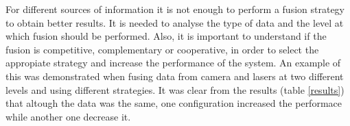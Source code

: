 For different sources of information it is not enough to perform a fusion strategy to obtain better results. It is needed to analyse the type of data and the level at which fusion should be performed. Also, it is important to understand if the fusion is competitive, complementary or cooperative, in order to select the appropiate strategy and increase the performance of the system. An example of this was demonstrated when fusing data from camera and lasers at two different levels and using different strategies. It was clear from the results (table \ref{results}) that altough the data was the same, one configuration increased the performace while another one decrease it.





